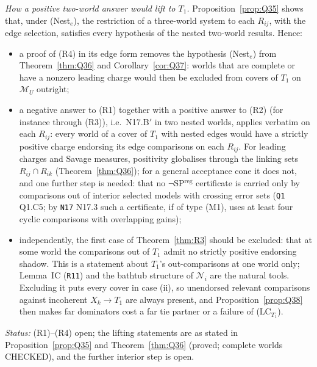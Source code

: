\documentclass[11pt]{article}
\theoremstyle{definition}
\theoremstyle{remark}
\newcommand{\M}{\mathcal M}
\newcommand{\src}[1]{\texttt{#1}}
\begin{document}
\emph{How a positive two-world answer would lift to $T_1$.} Proposition~\ref{prop:Q35} shows that, under (Nest$_e$), the restriction of a three-world system to each $R_{ij}$, with the edge selection, satisfies every hypothesis of the nested two-world results. Hence:
\begin{itemize}[leftmargin=*]
\item a proof of (R4) in its edge form removes the hypothesis (Nest$_e$) from Theorem~\ref{thm:Q36} and Corollary~\ref{cor:Q37}: worlds that are complete or have a nonzero leading charge would then be excluded from covers of $T_1$ on $\M_U$ outright;
\item a negative answer to (R1) together with a positive answer to (R2) (for instance through (R3)), i.e.\ N17.B$'$ in two nested worlds, applies verbatim on each $R_{ij}$: every world of a cover of $T_1$ with nested edges would have a strictly positive charge endorsing its edge comparisons on each $R_{ij}$. For leading charges and Savage measures, positivity globalises through the linking sets $R_{ij}\cap R_{ik}$ (Theorem~\ref{thm:Q36}); for a general acceptance cone it does not, and one further step is needed: that no $\neg$SP$^{\mathrm{reg}}$ certificate is carried only by comparisons out of interior selected models with crossing error sets (\src{Q1} Q1.C5; by \src{N17} N17.3 such a certificate, if of type (M1), uses at least four cyclic comparisons with overlapping gains);
\item independently, the first case of Theorem~\ref{thm:R3} should be excluded: that at some world the comparisons out of $T_1$ admit no strictly positive endorsing shadow. This is a statement about $T_1$'s out-comparisons at one world only; Lemma~IC (\src{R11}) and the bathtub structure of $\mathcal N_i$ are the natural tools. Excluding it puts every cover in case (ii), so unendorsed relevant comparisons against incoherent $X_k\to T_1$ are always present, and Proposition~\ref{prop:Q38} then makes far dominators cost a far tie partner or a failure of (LC$_{T_1}$).
\end{itemize}
\emph{Status:} (R1)--(R4) open; the lifting statements are as stated in Proposition~\ref{prop:Q35} and Theorem~\ref{thm:Q36} (proved; complete worlds CHECKED), and the further interior step is open.
\end{document}
